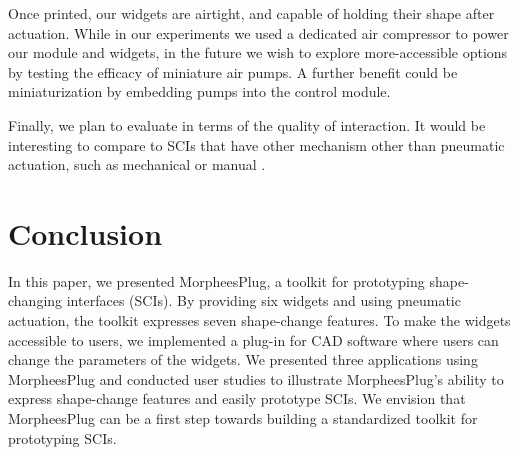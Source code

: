     Once printed, our widgets are airtight, and capable of holding their shape
    after actuation. While in our experiments we used a dedicated air compressor
    to power our module and widgets, in the future we wish to explore
    more-accessible options by testing the efficacy of miniature air pumps. A
    further benefit could be miniaturization by embedding pumps into the control
    module.
      
    Finally, we plan to evaluate \mp in terms of the quality of interaction. It
    would be interesting to compare \mp to SCIs that have other mechanism other
    than pneumatic actuation, such as mechanical \cite{10.1145/3173574.3173724}
    or manual \cite{10.1145/3131277.3132179}.%
      
  \section{Conclusion}
    In this paper, we presented MorpheesPlug, a toolkit for prototyping
    shape-changing interfaces (SCIs). By providing six widgets and using
    pneumatic actuation, the toolkit expresses seven shape-change features. To
    make the widgets accessible to users, we implemented a plug-in for CAD
    software where users can change the parameters of the widgets. We presented
    three applications using MorpheesPlug and conducted user studies to
    illustrate MorpheesPlug's ability to express shape-change features and
    easily prototype SCIs.  We envision that MorpheesPlug can be a first step
    towards building a standardized toolkit for prototyping SCIs.